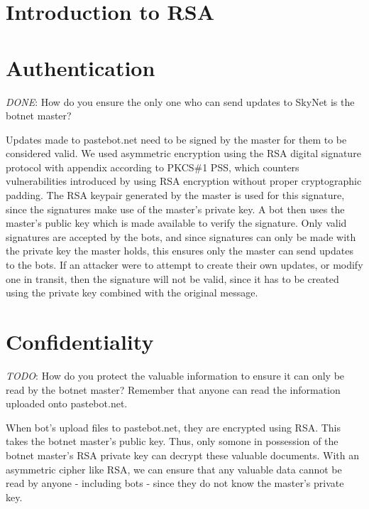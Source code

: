 \documentclass[9pt,a4paper]{article}
\begin{document}
\maketitle
\small
\setlength{\parindent}{0pt}

\section{Introduction to RSA}

\section{Authentication}
\emph{DONE}: How do you ensure the only one who can send updates to SkyNet is the botnet master?

Updates made to pastebot.net need to be signed by the master for them to be considered valid. We used asymmetric encryption using the RSA digital signature protocol with appendix according to PKCS\#1 PSS, which counters vulnerabilities introduced by using RSA encryption without proper cryptographic padding. The RSA keypair generated by the master is used for this signature, since the signatures make use of the master's private key. A bot then uses the master's public key which is made available to verify the signature. Only valid signatures are accepted by the bots, and since signatures can only be made with the private key the master holds, this ensures only the master can send updates to the bots. If an attacker were to attempt to create their own updates, or modify one in transit, then the signature will not be valid, since it has to be created using the private key combined with the original message.

\section{Confidentiality}
\emph{TODO}: How do you protect the valuable information to ensure it can only  be read by the botnet master? Remember that anyone can read the  information uploaded onto pastebot.net.

When bot's upload files to pastebot.net, they are encrypted using RSA. This takes the botnet master's public key. Thus, only somone in possession of the botnet master's RSA private key can decrypt these valuable documents. With an asymmetric cipher like RSA, we can ensure that any valuable data cannot be read by anyone - including bots - since they do not know the master's private key.
\end{document}
